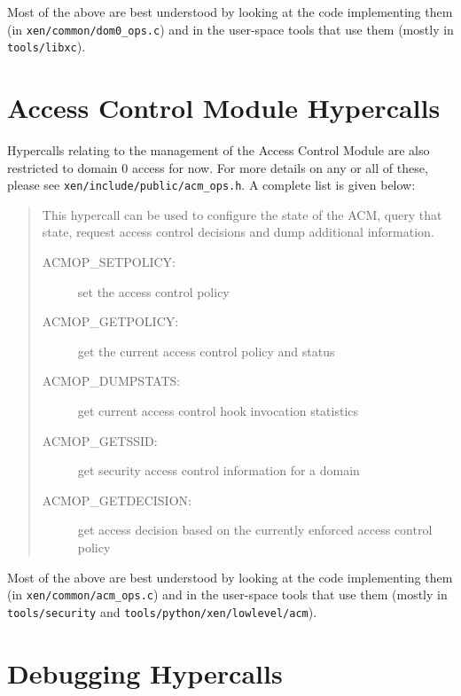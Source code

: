 \documentclass[11pt,twoside,final,openright]{report}
\newcommand{\hypercall}[1]{\vspace{2mm}{\sf #1}}
\begin{document}
Most of the above are best understood by looking at the code 
implementing them (in {\tt xen/common/dom0\_ops.c}) and in 
the user-space tools that use them (mostly in {\tt tools/libxc}). 

\section{Access Control Module Hypercalls}
\label{s:acmops}

Hypercalls relating to the management of the Access Control Module are
also restricted to domain 0 access for now. For more details on any or
all of these, please see {\tt xen/include/public/acm\_ops.h}.  A
complete list is given below:

\begin{quote}

\hypercall{acm\_op(int cmd, void *args)}

This hypercall can be used to configure the state of the ACM, query
that state, request access control decisions and dump additional
information.

\begin{description}

\item [ACMOP\_SETPOLICY:] set the access control policy

\item [ACMOP\_GETPOLICY:] get the current access control policy and
  status

\item [ACMOP\_DUMPSTATS:] get current access control hook invocation
  statistics

\item [ACMOP\_GETSSID:] get security access control information for a
  domain

\item [ACMOP\_GETDECISION:] get access decision based on the currently
  enforced access control policy

\end{description}
\end{quote}

Most of the above are best understood by looking at the code
implementing them (in {\tt xen/common/acm\_ops.c}) and in the
user-space tools that use them (mostly in {\tt tools/security} and
{\tt tools/python/xen/lowlevel/acm}).


\section{Debugging Hypercalls} 
\end{document}
